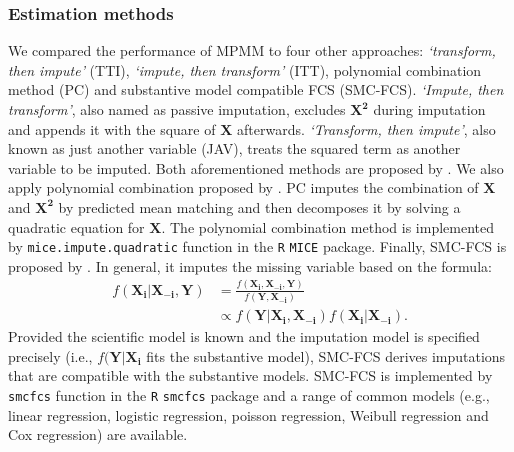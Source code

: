 	\subsubsection{Estimation methods}
	We compared the performance of MPMM to four other approaches: \emph{`transform, then impute'} (TTI), \emph{`impute, then transform'} (ITT), polynomial combination method (PC) and substantive model compatible FCS (SMC-FCS). \emph{`Impute, then transform'}, also named as passive imputation, excludes $\boldsymbol{X^2}$ during imputation and appends it with the square of $\boldsymbol{X}$ afterwards. \emph{`Transform, then impute'}, also known as just another variable (JAV), treats the squared term as another variable to be imputed. Both aforementioned methods are proposed by \citet{vonhippe2009}. We also apply polynomial combination proposed by \citet{Vink2013}. PC imputes the combination of $\boldsymbol{X}$ and $\boldsymbol{X^2}$ by predicted mean matching and then decomposes it by solving a quadratic equation for $\boldsymbol{X}$. The polynomial combination method is implemented by \texttt{mice.impute.quadratic} function in the \texttt{R} \texttt{MICE} package. Finally, SMC-FCS is proposed by \citet{bartlett2015multiple}. In general, it imputes the missing variable based on the formula:
	\begin{equation}
		\begin{array}{ll}
			f(\boldsymbol{X_{i}}|\boldsymbol{X_{-i}}, \boldsymbol{Y}) &= \frac{f(\boldsymbol{X_{i}}, \boldsymbol{X_{-i}}, \boldsymbol{Y})}{f(\boldsymbol{Y}, \boldsymbol{X_{-i}})}\\
			&\propto f(\boldsymbol{Y}|\boldsymbol{X_{i}}, \boldsymbol{X_{-i}})f(\boldsymbol{X_{i}}|\boldsymbol{X_{-i}}).
		\end{array} 
	\end{equation}
	Provided the scientific model is known and the imputation model is specified precisely (i.e., $f(\boldsymbol{Y}|\boldsymbol{X_{i}}$ fits the substantive model), SMC-FCS derives imputations that are compatible with the substantive models. SMC-FCS is implemented by \texttt{smcfcs} function in the \texttt{R} \texttt{smcfcs} package and a range of common models (e.g., linear regression, logistic regression, poisson regression, Weibull regression and Cox regression) are available.
 
	
